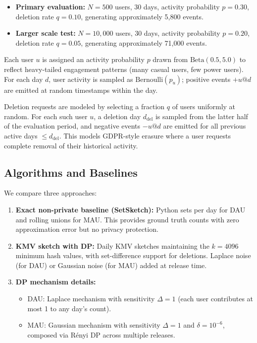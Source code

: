 \documentclass[11pt]{article}
\begin{document}
\begin{itemize}[leftmargin=*]
    \item \textbf{Primary evaluation:} $N = 500$ users, 30 days, activity probability $p = 0.30$, deletion rate $q = 0.10$, generating approximately 5,800 events.
    \item \textbf{Larger scale test:} $N = 10{,}000$ users, 30 days, activity probability $p = 0.20$, deletion rate $q = 0.05$, generating approximately 71,000 events.
\end{itemize}

Each user $u$ is assigned an activity probability $p$ drawn from $\text{Beta}(0.5, 5.0)$ to reflect heavy-tailed engagement patterns (many casual users, few power users). For each day $d$, user activity is sampled as $\text{Bernoulli}(p_u)$; positive events $+u@d$ are emitted at random timestamps within the day.

Deletion requests are modeled by selecting a fraction $q$ of users uniformly at random. For each such user $u$, a deletion day $d_{\text{del}}$ is sampled from the latter half of the evaluation period, and negative events $-u@d$ are emitted for all previous active days $\le d_{\text{del}}$. This models GDPR-style erasure where a user requests complete removal of their historical activity.

\subsection{Algorithms and Baselines}

We compare three approaches:

\begin{enumerate}[leftmargin=*]
    \item \textbf{Exact non-private baseline (SetSketch):} Python sets per day for DAU and rolling unions for MAU. This provides ground truth counts with zero approximation error but no privacy protection.
    
    \item \textbf{KMV sketch with DP:} Daily KMV sketches maintaining the $k=4096$ minimum hash values, with set-difference support for deletions. Laplace noise (for DAU) or Gaussian noise (for MAU) added at release time.
    
    \item \textbf{DP mechanism details:}
    \begin{itemize}
        \item DAU: Laplace mechanism with sensitivity $\Delta = 1$ (each user contributes at most 1 to any day's count).
        \item MAU: Gaussian mechanism with sensitivity $\Delta = 1$ and $\delta = 10^{-6}$, composed via Rényi DP across multiple releases.
    \end{itemize}
\end{enumerate}
\end{document}
